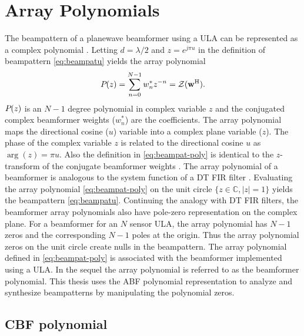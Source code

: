 
\section{Array Polynomials}
\label{sec:array-poly}
The beampattern of a planewave beamformer using a ULA can be
represented as a complex polynomial
\cite{Schelkunoff1943array, Steinberg1976}. Letting $d = \lambda/2$ and
$z = e^{j\pi u}$ in the definition of beampattern \eqref{eq:beampatu} yields the array polynomial
\begin{equation}
  \label{eq:beampat-poly}
  {P}_{}(z) = \sum\limits_{n=0}^{N-1} w^*_n z^{-n} = \mathcal{Z}({\bf w}^{\rm H}).
\end{equation}
${P}_{}(z)$ is an $N-1$ degree polynomial in complex variable $z$
and the conjugated complex beamformer weights ($w^*_n$) are the
coefficients. The array polynomial maps the directional cosine ($u$)
variable into a complex plane variable ($z$). The phase of the complex
variable $z$ is related to the directional cosine $u$ as
$\operatorname{arg}(z) = \pi u$. Also the definition in
\eqref{eq:beampat-poly} is identical to the $z$-transform of the
conjugate beamformer weights \cite[Chap.~3]{Oppenheim1989}. The array
polynomial of a beamformer is analogous to the system function of a DT
FIR filter \cite{Oppenheim1989}. Evaluating the array polynomial
\eqref{eq:beampat-poly} on the unit circle
$\lbrace z \in \mathbb{C}, |z| = 1\rbrace$ yields the beampattern
\eqref{eq:beampatu}. Continuing the analogy with DT FIR filters, the
beamformer array polynomials also have pole-zero representation on the
complex plane. For a beamformer for an $N$ sensor ULA, the array
polynomial has $N - 1$ zeros and the corresponding $N - 1$ poles at
the origin. Thus the array polynomial zeros on the unit circle create
nulls in the beampattern. The array polynomial defined in
\eqref{eq:beampat-poly} is associated with the beamformer implemented
using a ULA. In the sequel the array polynomial is referred to as the
beamformer polynomial. This thesis uses the ABF polynomial
representation to analyze and synthesize beampatterns by manipulating
the polynomial zeros.

\subsection{CBF polynomial}
\label{sec:cbf-polynomial}

